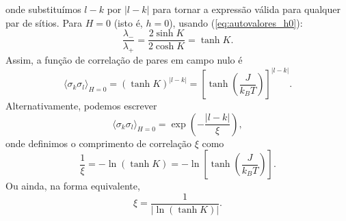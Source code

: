 \documentclass[11pt,a4paper]{article}
\begin{document}
%
onde substituímos $l-k$ por $|l-k|$ para tornar a expressão válida para qualquer par de sítios.
%
Para $H = 0$ (isto é, $h = 0$), usando (\ref{eq:autovalores_h0}):
%
\begin{equation}
\frac{\lambda_-}{\lambda_+}
= \frac{2\sinh K}{2\cosh K}
= \tanh K.
\end{equation}
%
Assim, a função de correlação de pares em campo nulo é
%
\begin{equation}
\boxed{
\langle \sigma_k \sigma_l \rangle_{H=0}
= \left( \tanh K \right)^{|l-k|}
= \left[ \tanh\left( \frac{J}{k_B T} \right) \right]^{|l-k|}
}.
\label{eq:correlacao_h0}
\end{equation}
%
Alternativamente, podemos escrever
%
\begin{equation}
\langle \sigma_k \sigma_l \rangle_{H=0}
= \exp\left( - \frac{|l-k|}{\xi} \right),
\end{equation}
%
onde definimos o comprimento de correlação $\xi$ como
%
\begin{equation}
\boxed{
\frac{1}{\xi} = - \ln( \tanh K )
= - \ln\left[ \tanh\left( \frac{J}{k_B T} \right) \right]
}.
\label{eq:comprimento_correlacao}
\end{equation}
%
Ou ainda, na forma equivalente,
%
\begin{equation}
\boxed{
\xi = \frac{1}{ |\ln(\tanh K)| }.
}
\label{eq:xi_forma2}
\end{equation}
%
\end{document}
